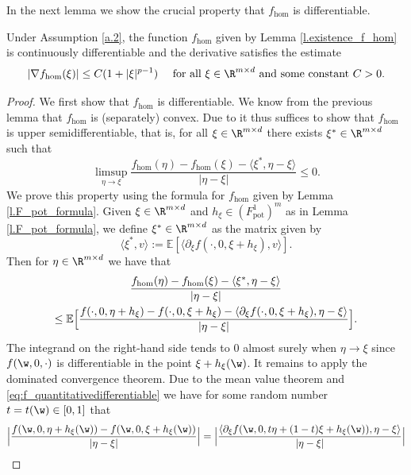 In the next lemma we show the crucial property that $f_{\hom}$ is differentiable.
\begin{proposition}\label{p.differentiable}
Under Assumption \ref{a.2}, the function $f_{\hom}$ given by Lemma \ref{l.existence_f_hom} is continuously differentiable and the derivative satisfies the estimate
\begin{equation*}
|\nabla f_{\hom}(\xi)|\leq C(1+|\xi|^{p-1})\quad\text{ for all }\xi\in\R^{m\times d}\text{ and some constant }C>0.
\end{equation*}
\end{proposition}
\begin{proof}
We first show that $f_{\hom}$ is differentiable. We know from the previous lemma that $f_{\hom}$ is (separately) convex. Due to \cite[Cor.\,2.5]{BKK} it thus suffices to show that $f_{\hom}$ is upper semidifferentiable, that is, for all $\xi\in\R^{m\times d}$ there exists $\xi^*\in\R^{m\times d}$ such that
\begin{equation*}
\limsup_{\eta\to \xi}\frac{f_{\hom}(\eta)-f_{\hom}(\xi)-\langle\xi^*,\eta-\xi\rangle}{|\eta-\xi|}\leq 0.
\end{equation*}
We prove this property using the formula for $f_{\hom}$ given by Lemma \ref{l.F_pot_formula}. Given $\xi\in\R^{m\times d}$ and $h_{\xi}\in (F_\mathrm{pot}^1)^m$ as in Lemma \ref{l.F_pot_formula}, we define $\xi^*\in\R^{m\times d}$ as the matrix given by
\begin{equation*}
\langle \xi^*,v\rangle:=\mathbb{E}[\langle\partial_{\xi}f(\cdot,0,\xi+h_{\xi}),v\rangle].
\end{equation*}
Then for $\eta\in\R^{m\times d}$ we have that
\begin{multline}\label{eq:upper_diff}
\frac{f_{\hom}(\eta)-f_{\hom}(\xi)-\langle\xi^*,\eta-\xi\rangle}{|\eta-\xi|}
\\
\leq  \mathbb{E}\Bigl[\frac{f(\cdot,0,\eta+h_{\xi})-f(\cdot,0,\xi+h_{\xi})-\langle\partial_{\xi}f(\cdot,0,\xi+h_{\xi}),\eta-\xi\rangle}{|\eta-\xi|}\Bigr].
\end{multline}
The integrand on the right-hand side tends to $0$ almost surely when $\eta\to\xi$ since $f(\w,0,\cdot)$ is differentiable in the point $\xi+h_{\xi}(\w)$. It remains to apply the dominated convergence theorem. Due to the mean value theorem and \eqref{eq:f_quantitativedifferentiable} we have for some random number $t=t(\w)\in [0,1]$ that
\begin{multline*}
\Bigl|\frac{f(\w,0,\eta+h_{\xi}(\w))-f(\w,0,\xi+h_{\xi}(\w))}{|\eta-\xi|}\Bigr|= \Bigl|\frac{\langle\partial_{\xi}f(\w,0,t\eta+(1-t)\xi+h_{\xi}(\w)),\eta-\xi\rangle}{|\eta-\xi|}\Bigr|

\end{multline*}
\end{proof}
